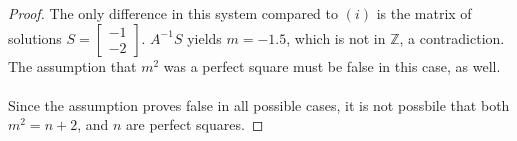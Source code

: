 \documentclass[a4paper, 12pt]{article}
\theoremstyle{plain}
\begin{document}
\begin{proof}
    The only difference in this system compared to $(i)$ is the matrix of solutions 
    $S = \left[\begin{smallmatrix}
        -1 \\
        -2
    \end{smallmatrix}\right]$. $A^{-1}S$ yields $m = -1.5$, which is not in $\mathbb{Z}$,
    a contradiction. The assumption that $m^2$ was a perfect square must be false in this case, 
    as well.
    \\ \\Since the assumption proves false in all possible cases, it is not possbile that 
    both $m^2 = n + 2$, and $n$ are perfect squares.
\end{proof}
\end{document}

